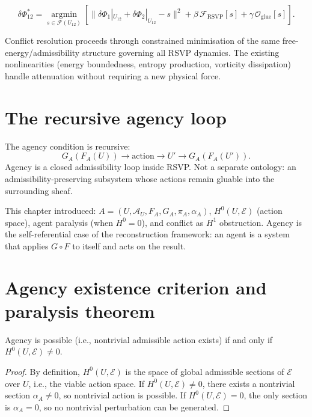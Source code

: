 \begin{definition}
  \[
    \delta\Phi^*_{12}
    = \operatorname*{argmin}_{s \in \mathcal{F}(U_{12})}
    \left[
      \|\delta\Phi_1|_{U_{12}} + \delta\Phi_2|_{U_{12}} - s\|^2
      + \beta\,\mathcal{F}_{\mathrm{RSVP}}[s]
      + \gamma\,\mathcal{O}_{\mathrm{glue}}[s]
    \right].
  \]
\end{definition}

Conflict resolution proceeds through constrained minimisation
of the same free-energy/admissibility structure governing all
RSVP dynamics.
The existing nonlinearities (energy boundedness, entropy production,
vorticity dissipation) handle attenuation without requiring a
new physical force.

\section{The recursive agency loop}

The agency condition is recursive:
\[
  G_A(F_A(U)) \to \text{action} \to U' \to G_A(F_A(U')).
\]
Agency is a closed admissibility loop inside RSVP.
Not a separate ontology: an admissibility-preserving subsystem
whose actions remain gluable into the surrounding sheaf.

\begin{MathEcho}
  This chapter introduced:
  $A = (U, \mathcal{A}_U, F_A, G_A, \pi_A, \alpha_A)$,
  $H^0(U, \mathcal{E})$ (action space),
  agent paralysis (when $H^0 = 0$),
  and conflict as $H^1$ obstruction.
  Agency is the self-referential case of the reconstruction
  framework: an agent is a system that applies $G \circ F$
  to itself and acts on the result.
\end{MathEcho}

\section{Agency existence criterion and paralysis theorem}

\begin{theorem}
  \label{thm:agency-existence}
  \statusproven{}
  Agency is possible (i.e., nontrivial admissible action exists)
  if and only if $H^0(U, \mathcal{E}) \neq 0$.
\end{theorem}

\begin{proof}
  By definition, $H^0(U,\mathcal{E})$ is the space of global
  admissible sections of $\mathcal{E}$ over $U$, i.e., the
  viable action space.
  If $H^0(U,\mathcal{E}) \neq 0$, there exists a nontrivial
  section $\alpha_A \neq 0$, so nontrivial action is possible.
  If $H^0(U,\mathcal{E}) = 0$, the only section is $\alpha_A = 0$,
  so no nontrivial perturbation can be generated.
\end{proof}

